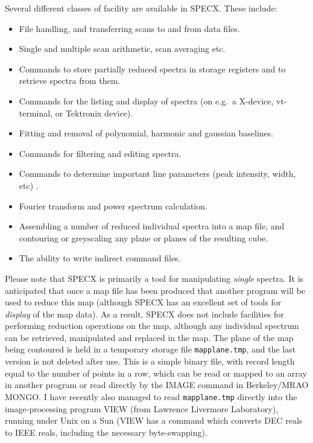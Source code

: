 \documentclass[11pt,twoside]{report}
\begin{document}
Several different classes of facility are available in SPECX. These include:
\begin{itemize}
\item File handling, and transferring scans to and from data files.
\item Single and multiple scan arithmetic, scan averaging etc.
\item Commands to store partially reduced spectra in storage registers and to
      retrieve spectra from them.
\item Commands for the listing and display of spectra (on e.g.\ a X-device,
      vt-terminal, or Tektronix device).
\item Fitting and removal of polynomial, harmonic and gaussian baselines.
\item Commands for filtering and editing spectra.
\item Commands to determine important line parameters (peak intensity, width,
      etc) .
\item Fourier transform and power spectrum calculation.
\item Assembling a number of reduced individual spectra into a map file,
      and contouring or greyscaling any plane or planes of the resulting cube.
\item The ability to write indirect command files.
\end{itemize}

Please note that SPECX is primarily a tool for manipulating {\em single}
spectra. It is anticipated that once a map file has been
produced that another program will be used to reduce this map (although SPECX
has an excellent set of tools for {\em display} of the map
data). As a result, SPECX does not include facilities for performing reduction
operations on the map, although any individual spectrum can be retrieved,
manipulated and replaced in the map. The plane of the map being contoured is
held in a temporary storage file
\texttt{mapplane.tmp}, and the last version is
not deleted after use. This is a simple binary file, with record length equal
to the number of points in a row, which can be read or mapped to an array in
another program or read directly by the IMAGE
 command in Berkeley/MRAO MONGO. I
have recently also managed to read \texttt{mapplane.tmp} directly into the
image-processing program VIEW (from Lawrence Livermore Laboratory), running
under Unix on a Sun (VIEW has a command which converts DEC reals to IEEE reals,
including the necessary byte-swapping).
\end{document}

